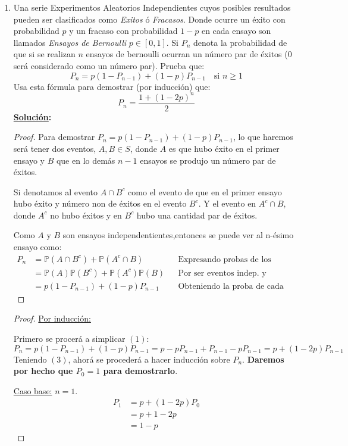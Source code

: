 \documentclass[11pt,letterpaper]{report}
\newcommand{\Pro}{\mathds{P}}
\newcommand{\sol}{\textbf{\underline{Solución}: }} %
\begin{document}
\begin{enumerate}
\item Una serie Experimentos Aleatorios Independientes cuyos posibles resultados pueden ser
clasificados como \emph{Exitos} ó \emph{Fracasos}. Donde ocurre un éxito con probabilidad $p$ y un
fracaso con probabilidad $1-p$ en cada ensayo son llamados \emph{Ensayos de Bernoulli}
$p \in [0, 1]$. Si $P_n$ denota la probabilidad de que si se realizan $n$ ensayos de bernoulli
ocurran un número par de éxitos (0 será considerado como un número par). Prueba que:
\[
    P_n = p(1 - P_{n-1})+(1-p)P_{n-1} \quad \text{si } n \geq 1 \tag{1}
\]
Usa esta fórmula para demostrar (por inducción) que:
\[
    P_n = \frac{1+ (1-2p)^n}{2} \tag{2}
\]
\sol \begin{proof}
    Para demostrar $P_n = p(1 - P_{n-1})+(1-p)P_{n-1}$, lo que haremos será tener dos eventos,
    $A, B \in S$, donde $A$ es que hubo éxito en el primer ensayo y $B$ que en lo demás $n-1$
    ensayos se produjo un número par de éxitos.

    Si denotamos al evento $A \cap B^c$ como el evento de que en el primer ensayo hubo éxito y
    número non de éxitos en el evento $B^c$. Y el evento en $A^c \cap B$, donde $A^c$
    no hubo éxitos y en $B^c$ hubo una cantidad par de éxitos.

    Como $A$ y $B$ son ensayos independentientes,entonces se puede ver al n-ésimo ensayo como:
    \begin{align*}
        P_n
            &= \Pro(A \cap B^c) + \Pro(A^c \cap B) && \text{Expresando probas de los eventos}\\
            &= \Pro(A)\Pro(B^c) + \Pro(A^c)\Pro(B) && \text{Por ser eventos indep. y aplicando la regla de la multiplicación}\\
            &= p(1 - P_{n-1})+(1-p)P_{n-1} && \text{Obteniendo la proba de cada evento}
    \end{align*}
\end{proof}

\begin{proof}
    \underline{Por inducción:}

    Primero se procerá a simplicar $(1)$:
    \[
        P_n = p(1 - P_{n-1})+(1-p)P_{n-1} = p - pP_{n-1} + P_{n-1} - pP_{n-1}
            = p + (1 - 2p)P_{n-1} \tag{3}
    \]
    Teniendo $(3)$, ahorá se procederá a hacer inducción sobre $P_n$. \textbf{Daremos por hecho que
    $P_0 = 1$ para demostrarlo}.
    
    \underline{Caso base:} $n=1$.
    \begin{align*}
        P_1
            &= p + (1 - 2p)P_0\\
            &= p + 1 - 2p\\
            &= 1 - p
    \end{align*}


\end{proof}
\end{enumerate}
\end{document}
